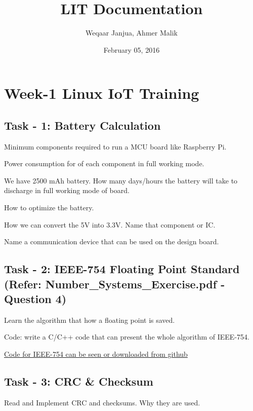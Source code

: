 \documentclass[letterpaper,10pt,english]{sphinxmanual}
\title{LIT Documentation}
\date{February 05, 2016}
\author{Weqaar Janjua, Ahmer Malik}
\begin{document}
\maketitle
\tableofcontents
{}\label{index::doc}



\chapter{Week-1 Linux IoT Training}
\label{week-01:user-guide-linuxiot-training}\label{week-01::doc}\label{week-01:week-1-linux-iot-training}\label{week-01:week-01}

\section{Task - 1: Battery Calculation}
\label{week-01:task-1-battery-calculation}
Minimum components required to run a MCU board like Raspberry Pi.

Power consumption for of each component in full working mode.

We have 2500 mAh battery. How many days/hours the battery will take to discharge in full working mode of board.

How to optimize the battery.

How we can convert the 5V into 3.3V. Name that component or IC.

Name a communication device that can be used on the design board.


\section{Task - 2: IEEE-754  Floating Point Standard (Refer: Number\_Systems\_Exercise.pdf -Question 4)}
\label{week-01:task-2-ieee-754-floating-point-standard-refer-number-systems-exercise-pdf-question-4}
Learn the algorithm that how a floating point is saved.

Code: write a C/C++ code that can present the whole algorithm of IEEE-754.

\href{https://github.com/Ahmer-444/personal-repo/blob/master/IEEE-754.c}{Code for IEEE-754 can be seen or downloaded from github}


\section{Task - 3: CRC \& Checksum}
\label{week-01:task-3-crc-checksum}
Read and Implement CRC and checksums. Why they are used.
\end{document}
